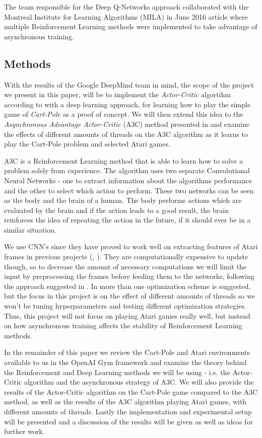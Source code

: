 \documentclass[11pt]{article}
\begin{document}
The team responsible for the Deep Q-Networks approach collaborated with
the Montreal Institute for Learning Algorithms (MILA) in June 2016 article
\cite{a3c} where multiple Reinforcement Learning methods were implemented to
take advantage of asynchronous training.

\subsection{Methods}

With the results of the Google DeepMind team in mind\cite{a3c}, the scope of the project we present in
this paper, will be to implement the \textit{Actor-Critic} algortihm according to \cite{RLbook}
with a deep learning approach, for learning how to play the simple game of \textit{Cart-Pole}\cite{cart_pole}
as a proof of concept.
We will then extend this idea to the \textit{Asynchronous Advantage Actor-Critic} (A3C)
method presented in \cite{a3c} and examine the effects of different amounts of threads
on the A3C algorithm as it learns to play the Cart-Pole problem and selected Atari games.

A3C is a Reinforcement Learning method that is able to learn
how to solve a problem solely from experience.
The algorithm uses two separate Convolutional Neural Networks
 - one to extract information about the algorithms performance 
and the other to select which action to perform.
These two networks can be seen as the body and the brain of a human.
The body performs actions which are evaluated by the brain and if
the action leads to a good result, the brain reinforces the idea
of repeating the action in the future, if it should ever be in a similar
situation.

We use CNN's since they have proved to work well on extracting features
of Atari frames in previous projects (\cite{dqn}, \cite{a3c}).
They are computationally expensive to update though,
so to decrease the amount of necessary computations we will limit
the input by preprocessing the frames before feeding them
to the networks, following the approach suggested in \cite{dqn-nature}.
In \cite{a3c} more than one optimization scheme
is suggested, but the focus in this project is on the effect of
different amounts of threads so we won't be tuning hyperparameters
and testing different optimization strategies.
Thus, this project will not focus on playing Atari games really well,
but instead on how asynchronous training affects the stability of
Reinforcement Learning methods.

In the remainder of this paper we review the 
Cart-Pole and Atari environments available to us in
the OpenAI Gym framework and examine the theory behind the
Reinforcement and Deep Learning methods we will be using
- i.e. the Actor-Critic algorithm and the asynchronous strategy of A3C.
We will also provide the results of the Actor-Critic algorithm
on the Cart-Pole game compared to the A3C method, as well as the
results of the A3C algorithm playing Atari games, with different 
amounts of threads. 
Lastly the implementation and experimental setup will be presented and
a discussion of the results will be given as well as ideas for further
work.
\end{document}
